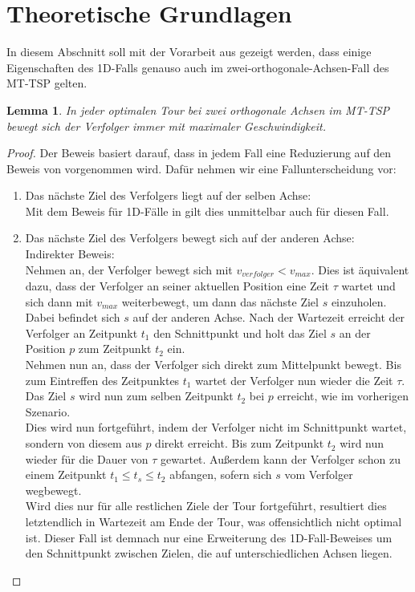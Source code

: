 \documentclass[german,version-2019-11]{uzl-thesis}
\newtheorem{lem}{Lemma}
\begin{document}
\section{Theoretische Grundlagen}

In diesem Abschnitt soll mit der Vorarbeit aus \cite{helvig} gezeigt werden, dass einige Eigenschaften des 1D-Falls genauso auch im zwei-orthogonale-Achsen-Fall des MT-TSP gelten.

\begin{lem}
\label{lem:1}
In jeder optimalen Tour bei zwei orthogonale Achsen im MT-TSP bewegt sich der Verfolger immer mit maximaler Geschwindigkeit.
\end{lem}
 
\begin{proof}
Der Beweis basiert darauf, dass in jedem Fall eine Reduzierung auf den Beweis von \cite{helvig} vorgenommen wird. Dafür nehmen wir eine Fallunterscheidung vor:
\begin{enumerate}
\item Das nächste Ziel des Verfolgers liegt auf der selben Achse: \\
Mit dem Beweis für 1D-Fälle in \cite{helvig} gilt dies unmittelbar auch für diesen Fall.

\item Das nächste Ziel des Verfolgers bewegt sich auf der anderen Achse: \\
Indirekter Beweis: \\
Nehmen an, der Verfolger bewegt sich mit $v_{verfolger} < v_{max}$. Dies ist äquivalent dazu, dass der Verfolger an seiner aktuellen Position eine Zeit $\tau$ wartet und sich dann mit $v_{max}$ weiterbewegt, um dann das nächste Ziel $s$ einzuholen. Dabei befindet sich $s$ auf der anderen Achse. Nach der Wartezeit erreicht der Verfolger an Zeitpunkt $t_1$ den Schnittpunkt und holt das Ziel $s$ an der Position $p$ zum Zeitpunkt $t_2$ ein. \\
Nehmen nun an, dass der Verfolger sich direkt zum Mittelpunkt bewegt. Bis zum Eintreffen des Zeitpunktes $t_1$ wartet der Verfolger nun wieder die Zeit $\tau$. Das Ziel $s$ wird nun zum selben Zeitpunkt $t_2$ bei $p$ erreicht, wie im vorherigen Szenario. \\
Dies wird nun fortgeführt, indem der Verfolger nicht im Schnittpunkt wartet, sondern von diesem aus $p$ direkt erreicht. Bis zum Zeitpunkt $t_2$ wird nun wieder für die Dauer von $\tau$ gewartet. Außerdem kann der Verfolger schon zu einem Zeitpunkt $t_1 \leq t_{s} \leq t_2$ abfangen, sofern sich $s$ vom Verfolger wegbewegt. \\
Wird dies nur für alle restlichen Ziele der Tour fortgeführt, resultiert dies letztendlich in Wartezeit am Ende der Tour, was offensichtlich nicht optimal ist. Dieser Fall ist demnach nur eine Erweiterung des 1D-Fall-Beweises um den Schnittpunkt zwischen Zielen, die auf unterschiedlichen Achsen liegen. 
\end{enumerate}


\end{proof}
\end{document}
